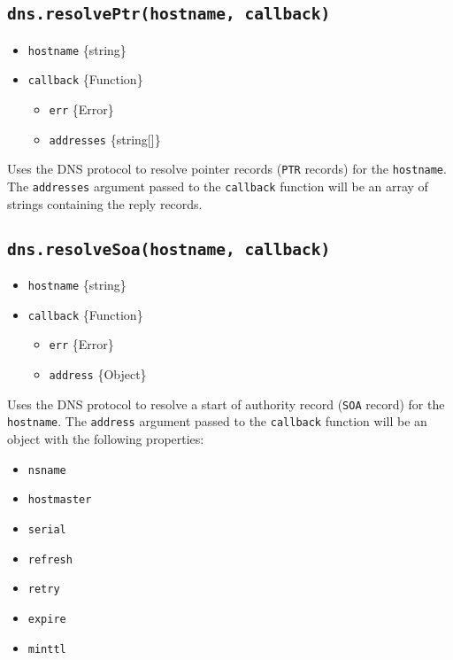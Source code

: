 \subsection{\texorpdfstring{\texttt{dns.resolvePtr(hostname,\ callback)}}{dns.resolvePtr(hostname, callback)}}\label{dns.resolveptrhostname-callback}

\begin{itemize}
\tightlist
\item
  \texttt{hostname} \{string\}
\item
  \texttt{callback} \{Function\}

  \begin{itemize}
  \tightlist
  \item
    \texttt{err} \{Error\}
  \item
    \texttt{addresses} \{string{[}{]}\}
  \end{itemize}
\end{itemize}

Uses the DNS protocol to resolve pointer records (\texttt{PTR} records)
for the \texttt{hostname}. The \texttt{addresses} argument passed to the
\texttt{callback} function will be an array of strings containing the
reply records.

\subsection{\texorpdfstring{\texttt{dns.resolveSoa(hostname,\ callback)}}{dns.resolveSoa(hostname, callback)}}\label{dns.resolvesoahostname-callback}

\begin{itemize}
\tightlist
\item
  \texttt{hostname} \{string\}
\item
  \texttt{callback} \{Function\}

  \begin{itemize}
  \tightlist
  \item
    \texttt{err} \{Error\}
  \item
    \texttt{address} \{Object\}
  \end{itemize}
\end{itemize}

Uses the DNS protocol to resolve a start of authority record
(\texttt{SOA} record) for the \texttt{hostname}. The \texttt{address}
argument passed to the \texttt{callback} function will be an object with
the following properties:

\begin{itemize}
\tightlist
\item
  \texttt{nsname}
\item
  \texttt{hostmaster}
\item
  \texttt{serial}
\item
  \texttt{refresh}
\item
  \texttt{retry}
\item
  \texttt{expire}
\item
  \texttt{minttl}
\end{itemize}

